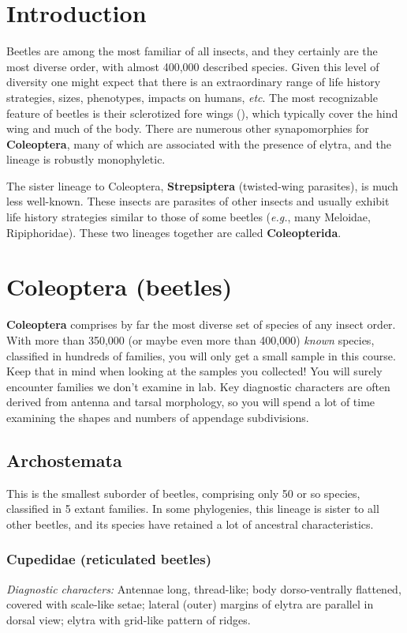 \section*{Introduction}
Beetles are among the most familiar of all insects, and they certainly are the most diverse order, with almost 400,000 described species. Given this level of diversity one might expect that there is an extraordinary range of life history strategies, sizes, phenotypes, impacts on humans, \textit{etc}. The most recognizable feature of beetles is their sclerotized fore wings (), which typically cover the hind wing and much of the body. There are numerous other synapomorphies for \textbf{Coleoptera}, many of which are associated with the presence of elytra, and the lineage is robustly monophyletic. 

The sister lineage to Coleoptera, \textbf{Strepsiptera} (twisted-wing parasites), is much less well-known. These insects are parasites of other insects and usually exhibit life history strategies similar to those of some beetles (\textit{e.g.}, many Meloidae, Ripiphoridae). These two lineages together are called \textbf{Coleopterida}.

\section{Coleoptera (beetles)}
\textbf{Coleoptera} comprises by far the most diverse set of species of any insect order. With more than 350,000 (or maybe even more than 400,000) \textit{known} species, classified in hundreds of families, you will only get a small sample in this course. Keep that in mind when looking at the samples you collected! You will surely encounter families we don't examine in lab. Key diagnostic characters are often derived from antenna and tarsal morphology, so you will spend a lot of time examining the shapes and numbers of appendage subdivisions.

\subsection{Archostemata}
This is the smallest suborder of beetles, comprising only 50 or so species, classified in 5 extant families. In some phylogenies, this lineage is sister to all other beetles, and its species have retained a lot of ancestral characteristics.

\subsubsection{Cupedidae (reticulated beetles)}
\noindent{}\textit{Diagnostic characters:} Antennae long, thread-like; body dorso-ventrally flattened, covered with scale-like setae; lateral (outer) margins of elytra are parallel in dorsal view; elytra with grid-like pattern of ridges.\vspace{3mm}


